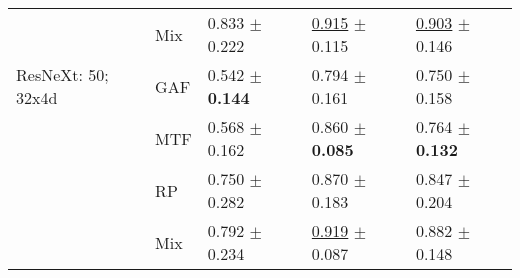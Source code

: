 \begin{tabular}[t]{lllll}
 & Mix & \textcolor[rgb]{0.1052631579,0.5000000000,0}{0.833} $\pm$ \textcolor[rgb]{0.5633152435,0.4366847565,0}{0.222} & \underline{\textcolor[rgb]{0.0766423358,0.5000000000,0}{0.915}} $\pm$ \textcolor[rgb]{0.2244136072,0.5000000000,0}{0.115} & \underline{\textcolor[rgb]{0.0967741935,0.5000000000,0}{0.903}} $\pm$ \textcolor[rgb]{0.1092946659,0.5000000000,0}{0.146} \\
ResNeXt: 50; 32x4d & GAF & \textcolor[rgb]{0.8421052632,0.1578947368,0}{0.542} $\pm$ \textbf{\textcolor[rgb]{0.0000000000,0.5000000000,0}{0.144}} & \textcolor[rgb]{0.4108825481,0.5000000000,0}{0.794} $\pm$ \textcolor[rgb]{0.5710931977,0.4289068023,0}{0.161} & \textcolor[rgb]{0.8064516129,0.1935483871,0}{0.750} $\pm$ \textcolor[rgb]{0.2081447489,0.5000000000,0}{0.158} \\
 & MTF & \textcolor[rgb]{0.7751196172,0.2248803828,0}{0.568} $\pm$ \textcolor[rgb]{0.1258520059,0.5000000000,0}{0.162} & \textcolor[rgb]{0.2277372263,0.5000000000,0}{0.860} $\pm$ \textbf{\textcolor[rgb]{0.0000000000,0.5000000000,0}{0.085}} & \textcolor[rgb]{0.7419354839,0.2580645161,0}{0.764} $\pm$ \textbf{\textcolor[rgb]{0.0000000000,0.5000000000,0}{0.132}} \\
 & RP & \textcolor[rgb]{0.3157894737,0.5000000000,0}{0.750} $\pm$ \textcolor[rgb]{1.0000000000,0.0000000000,0}{0.282} & \textcolor[rgb]{0.2014598540,0.5000000000,0}{0.870} $\pm$ \textcolor[rgb]{0.7422118602,0.2577881398,0}{0.183} & \textcolor[rgb]{0.3548387097,0.5000000000,0}{0.847} $\pm$ \textcolor[rgb]{0.5730017598,0.4269982402,0}{0.204} \\
 & Mix & \textcolor[rgb]{0.2105263158,0.5000000000,0}{0.792} $\pm$ \textcolor[rgb]{0.6537497604,0.3462502396,0}{0.234} & \underline{\textcolor[rgb]{0.0656934307,0.5000000000,0}{0.919}} $\pm$ \textcolor[rgb]{0.0110237087,0.5000000000,0}{0.087} & \textcolor[rgb]{0.1935483871,0.5000000000,0}{0.882} $\pm$ \textcolor[rgb]{0.1308023356,0.5000000000,0}{0.148} \\
\bottomrule
\end{tabular}

